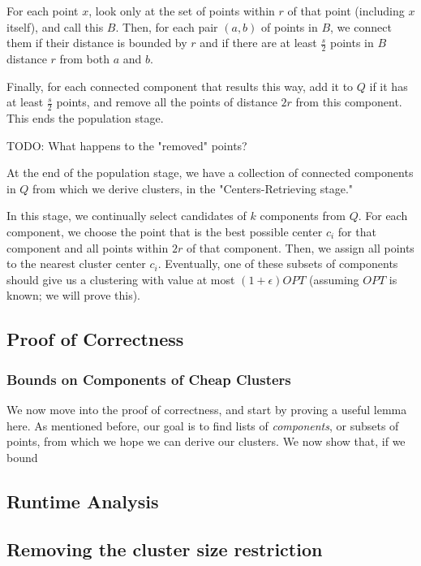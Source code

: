\documentclass[paper=a4, fontsize=11pt]{scrartcl} %
\numberwithin{equation}{section} %
\numberwithin{figure}{section} %
\numberwithin{table}{section} %
\begin{document}
For each point $x$, look only at the set of points within $r$ of that point (including $x$ itself), and call this $B$.  Then, for each pair $(a, b)$ of points in $B$, we connect them if their distance is bounded by $r$ and if there are at least $\frac{s}{2}$ points in $B$ distance $r$ from both $a$ and $b$.

Finally, for each connected component that results this way, add it to $Q$ if it has at least $\frac{s}{2}$ points, and remove all the points of distance $2r$ from this component.  This ends the population stage.

TODO: What happens to the "removed" points?

At the end of the population stage, we have a collection of connected components in $Q$ from which we derive clusters, in the "Centers-Retrieving stage."

In this stage, we continually select candidates of $k$ components from $Q$.  For each component, we choose the point that is the best possible center $c_i$ for that component and all points within $2r$ of that component.  Then, we assign all points to the nearest cluster center $c_i$.  Eventually, one of these subsets of components should give us a clustering with value at most $(1 + \epsilon) OPT$ (assuming $OPT$ is known; we will prove this).

\subsection{Proof of Correctness}

\subsubsection{Bounds on Components of Cheap Clusters}
We now move into the proof of correctness, and start by proving a useful lemma here.  As mentioned before, our goal is to find lists of \emph{components}, or subsets of points, from which we hope we can derive our clusters.  We now show that, if we bound

\subsection{Runtime Analysis}

\subsection{Removing the cluster size restriction}
\end{document}
